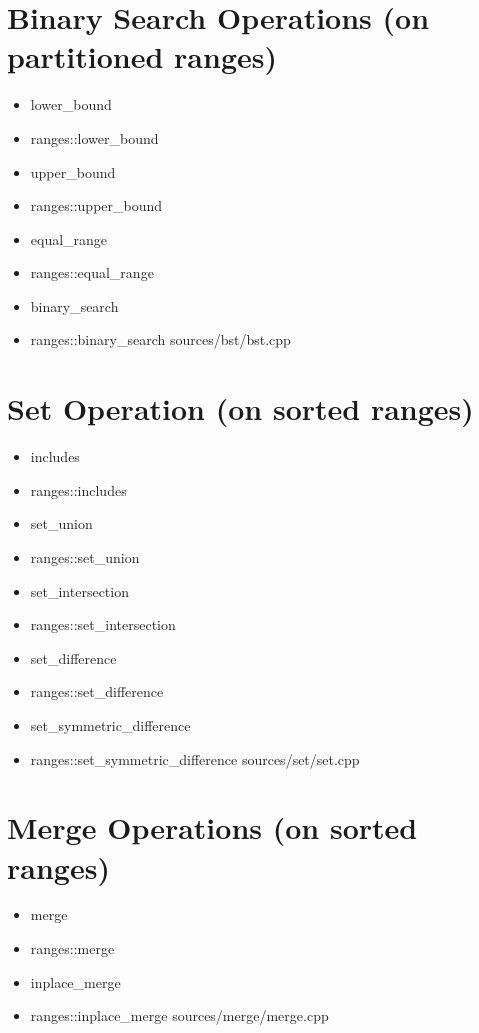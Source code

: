 \documentclass{article}
\begin{document}
\section{Binary Search Operations (on partitioned ranges)}
    \begin{itemize}
      \item lower\_bound
      \item ranges::lower\_bound
      \item upper\_bound
      \item ranges::upper\_bound
      \item equal\_range
      \item ranges::equal\_range
      \item binary\_search
      \item ranges::binary\_search
         {sources/bst/bst.cpp}
    \end{itemize}
\section{Set Operation (on sorted ranges)}
    \begin{itemize}
      \item includes
      \item ranges::includes
      \item set\_union
      \item ranges::set\_union
      \item set\_intersection
      \item ranges::set\_intersection
      \item set\_difference
      \item ranges::set\_difference
      \item set\_symmetric\_difference
      \item ranges::set\_symmetric\_difference
         {sources/set/set.cpp}
    \end{itemize}
\section{Merge Operations (on sorted ranges)}
    \begin{itemize}
      \item merge
      \item ranges::merge
      \item inplace\_merge
      \item ranges::inplace\_merge
         {sources/merge/merge.cpp}
    \end{itemize}
\end{document}
